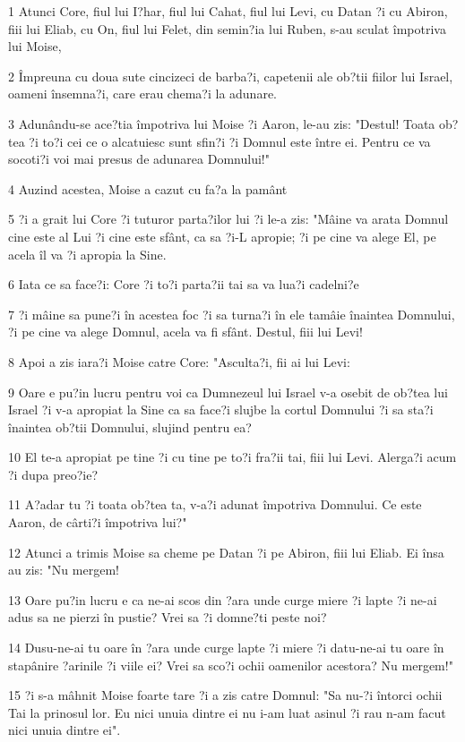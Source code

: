 \par 1 Atunci Core, fiul lui I?har, fiul lui Cahat, fiul lui Levi, cu Datan ?i cu Abiron, fiii lui Eliab, cu On, fiul lui Felet, din semin?ia lui Ruben, s-au sculat împotriva lui Moise,
\par 2 Împreuna cu doua sute cincizeci de barba?i, capetenii ale ob?tii fiilor lui Israel, oameni însemna?i, care erau chema?i la adunare.
\par 3 Adunându-se ace?tia împotriva lui Moise ?i Aaron, le-au zis: "Destul! Toata ob?tea ?i to?i cei ce o alcatuiesc sunt sfin?i ?i Domnul este între ei. Pentru ce va socoti?i voi mai presus de adunarea Domnului!"
\par 4 Auzind acestea, Moise a cazut cu fa?a la pamânt
\par 5 ?i a grait lui Core ?i tuturor parta?ilor lui ?i le-a zis: "Mâine va arata Domnul cine este al Lui ?i cine este sfânt, ca sa ?i-L apropie; ?i pe cine va alege El, pe acela îl va ?i apropia la Sine.
\par 6 Iata ce sa face?i: Core ?i to?i parta?ii tai sa va lua?i cadelni?e
\par 7 ?i mâine sa pune?i în acestea foc ?i sa turna?i în ele tamâie înaintea Domnului, ?i pe cine va alege Domnul, acela va fi sfânt. Destul, fiii lui Levi!
\par 8 Apoi a zis iara?i Moise catre Core: "Asculta?i, fii ai lui Levi:
\par 9 Oare e pu?in lucru pentru voi ca Dumnezeul lui Israel v-a osebit de ob?tea lui Israel ?i v-a apropiat la Sine ca sa face?i slujbe la cortul Domnului ?i sa sta?i înaintea ob?tii Domnului, slujind pentru ea?
\par 10 El te-a apropiat pe tine ?i cu tine pe to?i fra?ii tai, fiii lui Levi. Alerga?i acum ?i dupa preo?ie?
\par 11 A?adar tu ?i toata ob?tea ta, v-a?i adunat împotriva Domnului. Ce este Aaron, de cârti?i împotriva lui?"
\par 12 Atunci a trimis Moise sa cheme pe Datan ?i pe Abiron, fiii lui Eliab. Ei însa au zis: "Nu mergem!
\par 13 Oare pu?in lucru e ca ne-ai scos din ?ara unde curge miere ?i lapte ?i ne-ai adus sa ne pierzi în pustie? Vrei sa ?i domne?ti peste noi?
\par 14 Dusu-ne-ai tu oare în ?ara unde curge lapte ?i miere ?i datu-ne-ai tu oare în stapânire ?arinile ?i viile ei? Vrei sa sco?i ochii oamenilor acestora? Nu mergem!"
\par 15 ?i s-a mâhnit Moise foarte tare ?i a zis catre Domnul: "Sa nu-?i întorci ochii Tai la prinosul lor. Eu nici unuia dintre ei nu i-am luat asinul ?i rau n-am facut nici unuia dintre ei".

